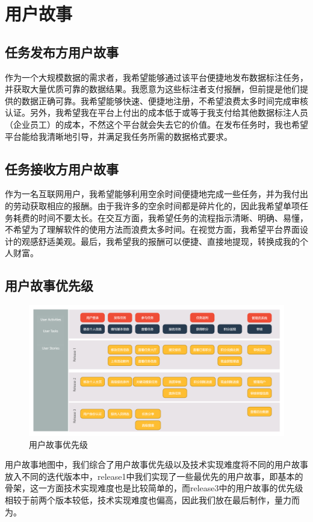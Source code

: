 \section{用户故事}

\subsection{任务发布方用户故事}

作为一个大规模数据的需求者，我希望能够通过该平台便捷地发布数据标注任务，并获取大量优质可靠的数据结果。我愿意为这些标注者支付报酬，但前提是他们提供的数据正确可靠。我希望能够快速、便捷地注册，不希望浪费太多时间完成审核认证。另外，我希望我在平台上付出的成本低于或等于我支付给其他数据标注人员（企业员工）的成本，不然这个平台就会失去它的价值。在发布任务时，我也希望平台能给我清晰地引导，并满足我任务所需的数据格式要求。

\subsection{任务接收方用户故事}

作为一名互联网用户，我希望能够利用空余时间便捷地完成一些任务，并为我付出的劳动获取相应的报酬。由于我许多的空余时间都是碎片化的，因此我希望单项任务耗费的时间不要太长。在交互方面，我希望任务的流程指示清晰、明确、易懂，不希望为了理解软件的使用方法而浪费太多时间。在视觉方面，我希望平台界面设计的观感舒适美观。最后，我希望我的报酬可以便捷、直接地提现，转换成我的个人财富。

\subsection{用户故事优先级}

\begin{figure}[h!]
    \centering
    \includegraphics[width=\linewidth]{imgs/roadmap.png}
    \caption{用户故事优先级}
\end{figure}

用户故事地图中，我们综合了用户故事优先级以及技术实现难度将不同的用户故事放入不同的迭代版本中，release1中我们实现了一些最优先的用户故事，即基本的骨架，这一方面技术实现难度也是比较简单的，而release3中的用户故事的优先级相较于前两个版本较低，技术实现难度也偏高，因此我们放在最后制作，量力而为。